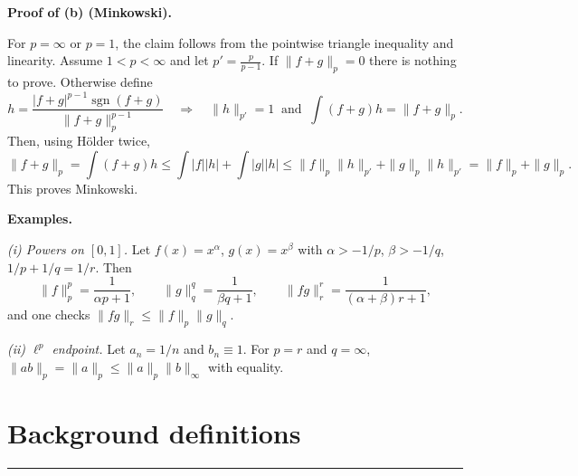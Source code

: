 \documentclass[12pt,a4paper]{article}
\theoremstyle{plain}
\theoremstyle{definition}
\theoremstyle{remark}
\theoremstyle{remark}
\newcommand{\tighthrule}{\vspace{0.6\baselineskip}\hrule\vspace{0.8\baselineskip}}
\theoremstyle{definition}
\begin{document}
\bigskip
\textbf{Proof of (b) (Minkowski).}

For $p=\infty$ or $p=1$, the claim follows from the pointwise triangle inequality and linearity.
Assume $1<p<\infty$ and let $p'=\frac{p}{p-1}$. If $\|f+g\|_p=0$ there is nothing to prove.
Otherwise define
\[
h=\frac{|f+g|^{p-1}\operatorname{sgn}(f+g)}{\|f+g\|_p^{p-1}} \quad\Rightarrow\quad \|h\|_{p'}=1
\ \text{ and }\ \int (f+g)h=\|f+g\|_p.
\]
Then, using Hölder twice,
\[
\|f+g\|_p
= \int (f+g)h
\le \int |f||h|+\int |g||h|
\le \|f\|_p\|h\|_{p'}+\|g\|_p\|h\|_{p'}
= \|f\|_p+\|g\|_p.
\]
This proves Minkowski.

\bigskip
\textbf{Examples.}

\emph{(i) Powers on $[0,1]$.}
Let $f(x)=x^{\alpha}$, $g(x)=x^{\beta}$ with $\alpha>-1/p$, $\beta>-1/q$, $1/p+1/q=1/r$. Then
\[
\|f\|_{p}^{p}=\frac{1}{\alpha p+1},\qquad
\|g\|_{q}^{q}=\frac{1}{\beta q+1},\qquad
\|fg\|_{r}^{r}=\frac{1}{(\alpha+\beta)r+1},
\]
and one checks $\|fg\|_{r}\le \|f\|_{p}\|g\|_{q}$.

\emph{(ii) $\ell^p$ endpoint.}
Let $a_n=1/n$ and $b_n\equiv 1$. For $p=r$ and $q=\infty$,
$\|ab\|_{p}=\|a\|_{p}\le \|a\|_{p}\|b\|_{\infty}$ with equality.
	
	

\section*{Background definitions}

\tighthrule
\end{document}
